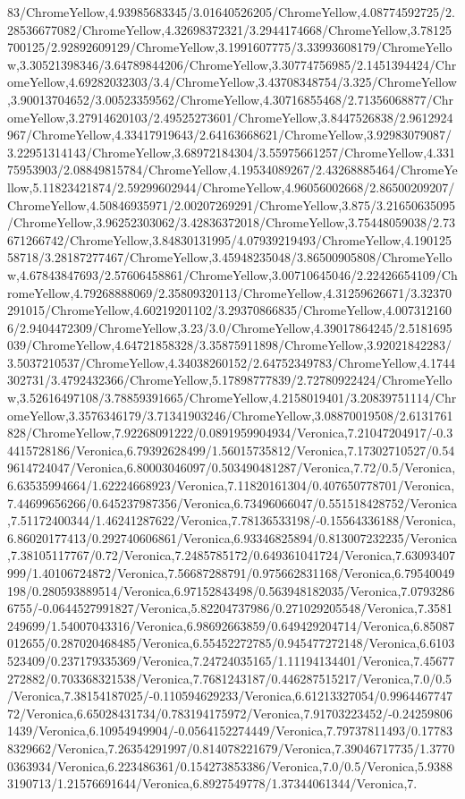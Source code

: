 {\begin{tikzternal}
83/ChromeYellow,4.93985683345/3.01640526205/ChromeYellow,4.08774592725/2.28536677082/ChromeYellow,4.32698372321/3.2944174668/ChromeYellow,3.78125700125/2.92892609129/ChromeYellow,3.1991607775/3.33993608179/ChromeYellow,3.30521398346/3.64789844206/ChromeYellow,3.30774756985/2.1451394424/ChromeYellow,4.69282032303/3.4/ChromeYellow,3.43708348754/3.325/ChromeYellow,3.90013704652/3.00523359562/ChromeYellow,4.30716855468/2.71356068877/ChromeYellow,3.27914620103/2.49525273601/ChromeYellow,3.8447526838/2.9612924967/ChromeYellow,4.33417919643/2.64163668621/ChromeYellow,3.92983079087/3.22951314143/ChromeYellow,3.68972184304/3.55975661257/ChromeYellow,4.33175953903/2.08849815784/ChromeYellow,4.19534089267/2.43268885464/ChromeYellow,5.11823421874/2.59299602944/ChromeYellow,4.96056002668/2.86500209207/ChromeYellow,4.50846935971/2.00207269291/ChromeYellow,3.875/3.21650635095/ChromeYellow,3.96252303062/3.42836372018/ChromeYellow,3.75448059038/2.73671266742/ChromeYellow,3.84830131995/4.07939219493/ChromeYellow,4.19012558718/3.28187277467/ChromeYellow,3.45948235048/3.86500905808/ChromeYellow,4.67843847693/2.57606458861/ChromeYellow,3.00710645046/2.22426654109/ChromeYellow,4.79268888069/2.35809320113/ChromeYellow,4.31259626671/3.32370291015/ChromeYellow,4.60219201102/3.29370866835/ChromeYellow,4.0073121606/2.9404472309/ChromeYellow,3.23/3.0/ChromeYellow,4.39017864245/2.5181695039/ChromeYellow,4.64721858328/3.35875911898/ChromeYellow,3.92021842283/3.5037210537/ChromeYellow,4.34038260152/2.64752349783/ChromeYellow,4.1744302731/3.4792432366/ChromeYellow,5.17898777839/2.72780922424/ChromeYellow,3.52616497108/3.78859391665/ChromeYellow,4.2158019401/3.20839751114/ChromeYellow,3.3576346179/3.71341903246/ChromeYellow,3.08870019508/2.6131761828/ChromeYellow,7.92268091222/0.0891959904934/Veronica,7.21047204917/-0.34415728186/Veronica,6.79392628499/1.56015735812/Veronica,7.17302710527/0.549614724047/Veronica,6.80003046097/0.503490481287/Veronica,7.72/0.5/Veronica,6.63535994664/1.62224668923/Veronica,7.11820161304/0.407650778701/Veronica,7.44699656266/0.645237987356/Veronica,6.73496066047/0.551518428752/Veronica,7.51172400344/1.46241287622/Veronica,7.78136533198/-0.15564336188/Veronica,6.86020177413/0.292740606861/Veronica,6.93346825894/0.813007232235/Veronica,7.38105117767/0.72/Veronica,7.2485785172/0.649361041724/Veronica,7.63093407999/1.40106724872/Veronica,7.56687288791/0.975662831168/Veronica,6.79540049198/0.280593889514/Veronica,6.97152843498/0.563948182035/Veronica,7.07932866755/-0.0644527991827/Veronica,5.82204737986/0.271029205548/Veronica,7.3581249699/1.54007043316/Veronica,6.98692663859/0.649429204714/Veronica,6.85087012655/0.287020468485/Veronica,6.55452272785/0.945477272148/Veronica,6.6103523409/0.237179335369/Veronica,7.24724035165/1.11194134401/Veronica,7.45677272882/0.703368321538/Veronica,7.7681243187/0.446287515217/Veronica,7.0/0.5/Veronica,7.38154187025/-0.110594629233/Veronica,6.61213327054/0.996446774772/Veronica,6.65028431734/0.783194175972/Veronica,7.91703223452/-0.242598061439/Veronica,6.10954949904/-0.0564152274449/Veronica,7.79737811493/0.177838329662/Veronica,7.26354291997/0.814078221679/Veronica,7.39046717735/1.37700363934/Veronica,6.223486361/0.154273853386/Veronica,7.0/0.5/Veronica,5.93883190713/1.21576691644/Veronica,6.8927549778/1.37344061344/Veronica,7.
\end{tikzternal}}
